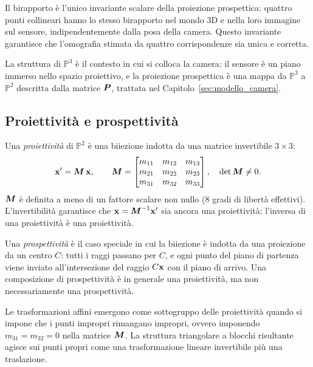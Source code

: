 \begin{oss}
Il birapporto è l'unico invariante scalare della proiezione prospettica:
quattro punti collineari hanno lo stesso birapporto nel mondo 3D e
nella loro immagine sul sensore, indipendentemente dalla posa della
camera. Questo invariante garantisce che l'omografia stimata da quattro
corrispondenze sia unica e corretta.
\end{oss}

La struttura di \(\mathbb{P}^3\) è il contesto in cui si colloca
la camera: il sensore è un piano immerso nello spazio proiettivo,
e la proiezione prospettica è una mappa da \(\mathbb{P}^3\) a
\(\mathbb{P}^2\) descritta dalla matrice \(\boldsymbol{P}\), trattata nel
Capitolo~\ref{sec:modello_camera}.

\subsection{Proiettività e prospettività}
\label{sub:proiettivita}

Una \emph{proiettività} di \(\mathbb{P}^2\) è una biiezione indotta
da una matrice invertibile \(3\times 3\):
\[
  \mathbf{x}' = \boldsymbol{M}\,\mathbf{x},
  \qquad
  \boldsymbol{M} =
  \begin{bmatrix}
    m_{11} & m_{12} & m_{13} \\
    m_{21} & m_{22} & m_{23} \\
    m_{31} & m_{32} & m_{33}
  \end{bmatrix},
  \quad \det\boldsymbol{M}\neq 0.
\]
\(\boldsymbol{M}\) è definita a meno di un fattore scalare non nullo
(8 gradi di libertà effettivi). L'invertibilità garantisce che
\(\mathbf{x}=\boldsymbol{M}^{-1}\mathbf{x}'\) sia ancora una proiettività:
l'inversa di una proiettività è una proiettività.

Una \emph{prospettività} è il caso speciale in cui la biiezione è
indotta da una proiezione da un centro \(C\): tutti i raggi passano
per \(C\), e ogni punto del piano di partenza viene inviato
all'intersezione del raggio \(C\mathbf{x}\) con il piano di arrivo.
Una composizione di prospettività è in generale una proiettività,
ma non necessariamente una prospettività.

\begin{oss}
Le trasformazioni affini emergono come sottogruppo delle proiettività
quando si impone che i punti impropri rimangano impropri, ovvero
imponendo \(m_{31}=m_{32}=0\) nella matrice \(\boldsymbol{M}\).
La struttura triangolare a blocchi risultante agisce sui punti propri
come una trasformazione lineare invertibile più una traslazione.
\end{oss}

